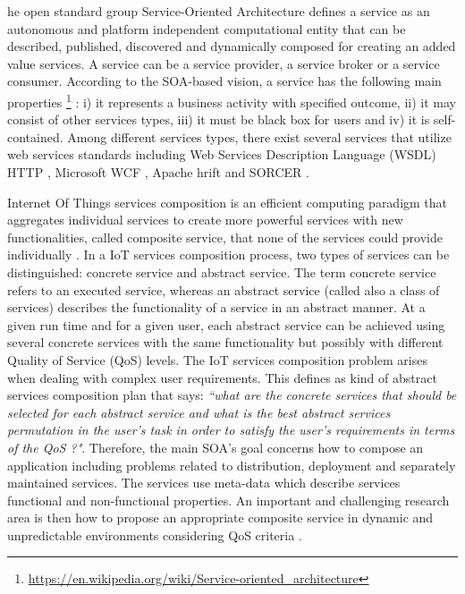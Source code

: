 \documentclass[10pt,journal,compsoc]{IEEEtran}
\begin{document}
he open standard group Service-Oriented Architecture \cite{soa} defines a service as an autonomous and platform independent computational entity that can be described, published, discovered and dynamically composed for creating an added value services. A service can be a service provider, a service broker or a service consumer. According to the SOA-based vision, a service has the following main properties \footnote{\url{https://en.wikipedia.org/wiki/Service-oriented_architecture}} : i) it represents a business activity with specified outcome, ii) it may consist of other services types, iii) it must be black box for users and iv) it is self-contained. Among different services types, there exist several services that utilize web services standards including Web Services Description Language (WSDL) \cite{christensen2001}HTTP \cite{Pautasso2014}, Microsoft WCF \cite{Cibraro2010}, Apache hrift \cite{Apachetrift2007} and SORCER \cite{Papazoglou2007b}.%

Internet Of Things services composition is an efficient computing paradigm that aggregates individual services to create more powerful services with new functionalities, called composite service, that none of the services could provide individually \cite{Papazoglou2007a}. In a IoT services composition process, two types of services can be distinguished: concrete service and abstract service. The term concrete service refers to an executed service, whereas an abstract service (called also a class of services) describes the functionality of a service in an abstract manner. At a given run time and for a given user, each abstract service can be achieved using several concrete services with the same functionality but possibly with different Quality of Service (QoS) levels. The IoT services composition problem arises when dealing with complex user requirements. This defines as kind of abstract services composition plan that says: \emph{``what are the concrete services that should be selected for each abstract service and what is the best abstract services permutation in the user's task in order to satisfy the user's requirements in terms of the QoS ?"}. Therefore, the main SOA's goal concerns how to compose an application including problems related to distribution, deployment and separately maintained services. The services use meta-data which describe services functional and non-functional properties. An important and challenging research area is then how to propose an appropriate composite service in dynamic and unpredictable environments considering QoS criteria \cite{Mostafa2015,BenMabrouk2009,SONG2013}. 
\end{document}
